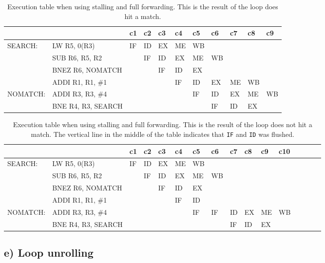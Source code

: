\begin{landscape}
    \begin{table}[]
    \centering
    \begin{tabular}{lllllllllll}
    \hline
             &                                         & c1 & c2 & c3 & c4 & c5 & c6 & c7 & c8 & c9 \\ \hline
    SEARCH:  & \multicolumn{1}{l|}{LW R5, 0(R3)}       & IF & ID & EX & ME & WB &    &    &    &    \\
             & \multicolumn{1}{l|}{SUB R6, R5, R2}     &    & IF & ID & EX & ME & WB &    &    &    \\
             & \multicolumn{1}{l|}{BNEZ R6, NOMATCH}   &    &    & IF & ID & EX &    &    &    &    \\
             & \multicolumn{1}{l|}{ADDI R1, R1, \#1}   &    &    &    & IF & ID & EX & ME & WB &    \\
    NOMATCH: & \multicolumn{1}{l|}{ADDI R3, R3, \#4}   &    &    &    &    & IF & ID & EX & ME & WB \\
             & \multicolumn{1}{l|}{BNE R4, R3, SEARCH} &    &    &    &    &    & IF & ID & EX &    \\ \hline
    \end{tabular}
    \caption{Execution table when using stalling and full forwarding. This is the result of the loop does hit a match.}
    \label{tab:t21dhit}
    \end{table}

    \begin{table}[]
    \centering
    \begin{tabular}{llllllllllllllll}
    \hline
             &                                         & c1 & c2 & c3 & c4 & c5                      & c6 & c7 & c8 & c9 & c10 \\ \hline
    SEARCH:  & \multicolumn{1}{l|}{LW R5, 0(R3)}       & IF & ID & EX & ME & WB                      &    &    &    &    &     \\
             & \multicolumn{1}{l|}{SUB R6, R5, R2}     &    & IF & ID & EX & ME                      & WB &    &    &    &     \\
             & \multicolumn{1}{l|}{BNEZ R6, NOMATCH}   &    &    & IF & ID & EX                      &    &    &    &    &     \\
             & \multicolumn{1}{l|}{ADDI R1, R1, \#1}   &    &    &    & IF & \multicolumn{1}{l|}{ID} &    &    &    &    &     \\
    NOMATCH: & \multicolumn{1}{l|}{ADDI R3, R3, \#4}   &    &    &    &    & \multicolumn{1}{l|}{IF} & IF & ID & EX & ME & WB  \\
             & \multicolumn{1}{l|}{BNE R4, R3, SEARCH} &    &    &    &    &                         &    & IF & ID & EX &     \\ \hline
    \end{tabular}
    \caption{Execution table when using stalling and full forwarding. This is the result of the loop does not hit a match. The vertical line in the middle of the table indicates that \texttt{IF} and \texttt{ID} was flushed.}
    \label{tab:t21dmiss}
    \end{table}
\end{landscape}



\subsection{e) Loop unrolling}
